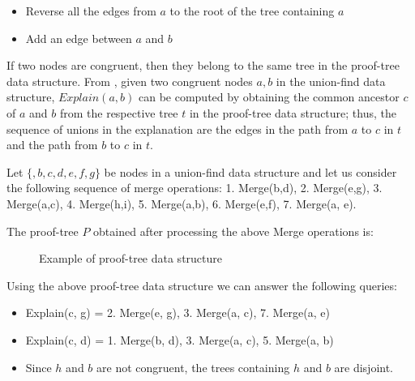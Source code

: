 \begin{itemize}
  \item Reverse all the edges from $a$ to the root
    of the tree containing $a$
  \item Add an edge between $a$ and $b$
\end{itemize}

If two nodes are congruent, then they belong to the same tree
in the proof-tree data structure. 
From \cite{10.1007/978-3-540-32033-3_33}, given two congruent 
nodes $a, b$ in the union-find data structure, 
$Explain(a, b)$ can be computed by obtaining the common ancestor
$c$ of $a$ and $b$ from the respective tree $t$ in the proof-tree data
structure; thus, the sequence of unions in the explanation 
are the edges in the 
path from $a$ to $c$ in $t$ and the path from $b$ to $c$ in $t$.

\begin{example}
  Let $\{, b, c, d, e, f, g\}$ be nodes in a union-find data
  structure and let us consider the following sequence of 
  merge operations: 1. Merge(b,d), 2. Merge(e,g), 3. Merge(a,c), 
  4. Merge(h,i), 5. Merge(a,b), 6. Merge(e,f), 7. Merge(a, e).

  The proof-tree $P$ obtained after processing the above
  Merge operations is:

  \begin{figure}[H]
    \centering
    \caption{Example of proof-tree data structure}
  \end{figure}

  Using the above proof-tree data structure we can answer
  the following queries:

  \begin{itemize}
    \item Explain(c, g) = 2. Merge(e, g), 3. Merge(a, c), 7. Merge(a, e)
    \item Explain(c, d) = 1. Merge(b, d), 3. Merge(a, c), 5. Merge(a, b)
    \item Since $h$ and $b$ are not congruent, the
      trees containing $h$ and $b$ are disjoint.
  \end{itemize}

\end{example}

